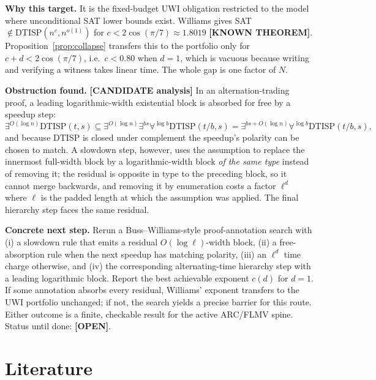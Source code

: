 \documentclass[11pt]{article}
\theoremstyle{remark}
\newcommand{\status}[1]{\textbf{[#1]}}
\newcommand{\DTISP}{\mathrm{DTISP}}
\begin{document}
\noindent\textbf{Why this target.} It is the fixed-budget UWI obligation restricted to the model where
unconditional SAT lower bounds exist. Williams gives SAT $\notin\DTISP(n^{c},n^{o(1)})$ for
$c<2\cos(\pi/7)\approx1.8019$ \status{KNOWN THEOREM}. Proposition~\ref{prop:collapse} transfers this to
the portfolio only for $c+d<2\cos(\pi/7)$, i.e.\ $c<0.80$ when $d=1$, which is vacuous because writing and
verifying a witness takes linear time. The whole gap is one factor of $N$.

\noindent\textbf{Obstruction found.} \status{CANDIDATE analysis} In an alternation-trading proof, a leading
logarithmic-width existential block is absorbed for free by a speedup step:
\[
\exists^{O(\log n)}\DTISP(t,s)\subseteq\exists^{O(\log n)}\exists^{bs}\forall^{\log b}\DTISP(t/b,s)
=\exists^{bs+O(\log n)}\forall^{\log b}\DTISP(t/b,s),
\]
and because $\DTISP$ is closed under complement the
speedup's polarity can be chosen to match. A slowdown step, however, uses the assumption to replace the
innermost full-width block by a logarithmic-width block \emph{of the same type} instead of removing it;
the residual is opposite in type to the preceding block, so it cannot merge backwards, and removing it by
enumeration costs a factor $\ell^{d}$ where $\ell$ is the padded length at which the assumption was applied.
The final hierarchy step faces the same residual.

\noindent\textbf{Concrete next step.} Rerun a Buss--Williams-style proof-annotation search with (i) a
slowdown rule that emits a residual $O(\log\ell)$-width block, (ii) a free-absorption rule when the next
speedup has matching polarity, (iii) an $\ell^{d}$ time charge otherwise, and (iv) the corresponding
alternating-time hierarchy step with a leading logarithmic block. Report the best achievable exponent
$c(d)$ for $d=1$. If some annotation absorbs every residual, Williams' exponent transfers to the UWI
portfolio unchanged; if not, the search yields a precise barrier for this route. Either outcome is a
finite, checkable result for the active ARC/FLMV spine. Status until done: \status{OPEN}.

\section{Literature}
\end{document}
